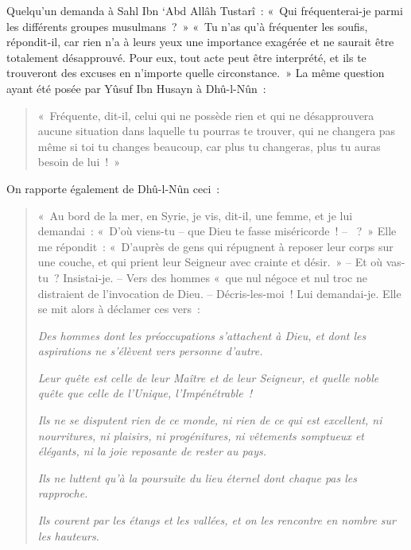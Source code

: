 Quelqu'un demanda à Sahl Ibn `Abd Allâh Tustarî~: «~Qui fréquenterai-je
parmi les différents groupes musulmans~?~» «~Tu n'as qu'à fréquenter les
soufis, répondit-il, car rien n'a à leurs yeux une importance exagérée
et ne saurait être totalement désapprouvé. Pour eux, tout acte peut être
interprété, et ils te trouveront des excuses en n'importe quelle
circonstance.~» La même question ayant été posée par Yûsuf Ibn Husayn à
Dhû-l-Nûn~:
\begin{quote}
«~Fréquente, dit-il, celui qui ne possède rien et qui ne désapprouvera
aucune situation dans laquelle tu pourras te trouver, qui ne changera
pas même si toi tu changes beaucoup, car plus tu changeras, plus tu
auras besoin de lui~!~»
\end{quote}
On rapporte également de Dhû-l-Nûn ceci~:
\begin{quote}
    
«~Au bord de la mer, en Syrie,
je vis, dit-il, une femme, et je lui demandai~: «~D'où viens-tu -- que
Dieu te fasse miséricorde~! -- ~?~» Elle me répondit~: «~D'auprès de
gens qui répugnent à reposer leur corps sur une couche, et qui prient
leur Seigneur avec crainte et désir.~» -- Et où vas-tu~? Insistai-je. --
Vers des hommes «~que nul négoce et nul troc ne distraient de
l'invocation de Dieu. -- Décris-les-moi~! Lui demandai-je. Elle se mit
alors à déclamer ces vers~:

\emph{Des hommes dont les préoccupations s'attachent à Dieu, et dont les
aspirations ne s'élèvent vers personne d'autre.}

\emph{Leur quête est celle de leur Maître et de leur Seigneur, et quelle
noble quête que celle de l'Unique, l'Impénétrable~!}

\emph{Ils ne se disputent rien de ce monde, ni rien de ce qui est
excellent, ni nourritures, ni plaisirs, ni progénitures, ni vêtements
somptueux et élégants, ni la joie reposante de rester au pays.}

\emph{Ils ne luttent qu'à la poursuite du lieu éternel dont chaque pas
les rapproche.}

\emph{Ils courent par les étangs et les vallées, et on les rencontre en
nombre sur les hauteurs.}
\end{quote}

